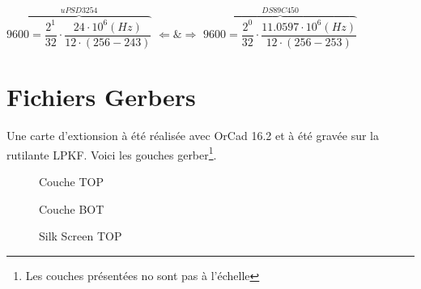 \documentclass[10pt,a4paper,final]{article}
\begin{document}
\begin{spacing}{1.5}
$\overbrace{9600 = \dfrac{2^{1}}{32} \cdot \dfrac{24\cdot10^{6}(Hz)}{12\cdot(256 - 243)}}^{uPSD 3254} $ $\Leftarrow \& \Rightarrow $ $ \overbrace{9600 = \dfrac{2^{0}}{32}\cdot \dfrac{11.0597 \cdot 10^{6}(Hz)}{12\cdot(256 - 253)}}^{DS89C450}$
\pagebreak
\section{Fichiers Gerbers}
Une carte d'extionsion à été réalisée avec OrCad 16.2 et à été gravée sur la rutilante LPKF. Voici les gouches gerber\footnote{Les couches présentées no sont pas à l'échelle}.

\begin{figure}[hbtp]
\caption{Couche TOP}
\centering
{}

\bigskip
\bigskip
\bigskip
\bigskip
\bigskip

\caption{Couche BOT}
\end{figure}

\vfill
\pagebreak

\begin{figure}[hbtp]
\caption{Silk Screen TOP}
\centering
{}


\end{figure}
\end{spacing}
\end{document}
